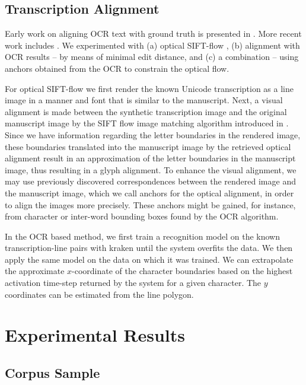 \subsection{Transcription Alignment}

Early work on aligning OCR text with ground truth is presented in \cite{Hobby}.
More recent work includes
\cite{DBLP:conf/jcdl/FengM06,DBLP:conf/icdar/YalnizM11,DBLP:conf/icdar/0002FFB11,OFTA,Leydier2014alignment,dense,Leydier2016alignment,Boillet2019}.
We experimented with (a) optical SIFT-flow \cite{OFTA}, (b) alignment with OCR
results -- by means of minimal edit distance, and (c) a combination -- using
anchors obtained from the OCR to constrain the optical flow.

For optical SIFT-flow we first render the known Unicode transcription as a line
image in a manner and font that is similar to the manuscript.  Next, a visual
alignment is made between the synthetic transcription image and the original
manuscript image by the SIFT flow image matching algorithm introduced in
\cite{liu2011sift}.  Since we have information regarding the letter boundaries
in the rendered image, these boundaries translated into the manuscript image by
the retrieved optical alignment result in an approximation of the letter
boundaries in the manuscript image, thus resulting in a glyph alignment.  To
enhance the visual alignment, we may use previously discovered correspondences
between the rendered image and the manuscript image, which we call anchors for
the optical alignment, in order to align the images more precisely.  These
anchors might be gained, for instance, from character or inter-word bounding
boxes found by the OCR algorithm. 

In the OCR based method, we first train a recognition model on the known
transcription-line pairs with kraken until the system overfits the data.  We
then apply the same model on the data on which it was trained.  We can
extrapolate the approximate $x$-coordinate of the character boundaries based on
the highest activation time-step returned by the system for a given character.
The $y$ coordinates can be estimated from the line polygon.

\section{Experimental Results}

\subsection{Corpus Sample}\label{sec:seg}

